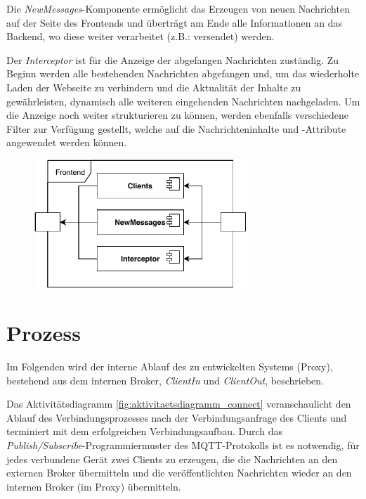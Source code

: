     Die \emph{NewMessages}-Komponente ermöglicht das Erzeugen von neuen Nachrichten auf der Seite des Frontends und überträgt am Ende alle Informationen an das Backend, wo diese weiter verarbeitet (z.B.: versendet) werden.
    
    Der \emph{Interceptor} ist für die Anzeige der abgefangen Nachrichten zuständig. Zu Beginn werden alle bestehenden Nachrichten abgefangen und, um das wiederholte Laden der Webseite zu verhindern und die Aktualität der Inhalte zu gewährleisten, dynamisch alle weiteren eingehenden Nachrichten nachgeladen. Um die Anzeige noch weiter strukturieren zu können, werden ebenfalls verschiedene Filter zur Verfügung gestellt, welche auf die Nachrichteninhalte und -Attribute angewendet werden können.
    \begin{figure}[h]%
        \centering
        \includegraphics[width=8cm]{tex/bilder/4_konzept/Systemdiagramm_Konzept_Frontend.pdf}
        \label{fig:system_frontend}
    \end{figure}

\section{Prozess}
    Im Folgenden wird der interne Ablauf des zu entwickelten Systems (Proxy), bestehend aus dem internen Broker, \emph{ClientIn} und \emph{ClientOut}, beschrieben.

    Das Aktivitätsdiagramm \ref{fig:aktivitaetsdiagramm_connect} veranschaulicht den Ablauf des Verbindungsprozesses nach der Verbindungsanfrage des Clients und terminiert mit dem erfolgreichen Verbindungsaufbau.
    Durch das \emph{Publish/Subscribe}-Programmiermuster des \ac{MQTT}-Protokolls ist es notwendig, für jedes verbundene Gerät zwei Clients zu erzeugen, die die Nachrichten an den externen Broker übermitteln und die veröffentlichten Nachrichten wieder an den internen Broker (im Proxy) übermitteln.
    
